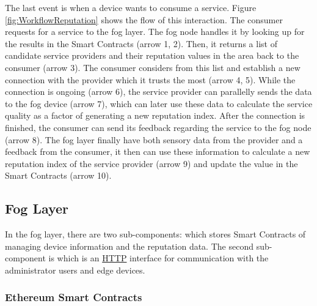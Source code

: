 \npara The last event is when a device wants to consume a service.
Figure \ref{fig:WorkflowReputation} shows the flow of this interaction.
The consumer requests for a service to the fog layer.
The fog node handles it by looking up for the results in the Smart Contracts (arrow 1, 2).
Then, it returns a list of candidate service providers and their reputation values in the area back to the consumer (arrow 3).
The consumer considers from this list and establish a new connection with the provider which it trusts the most (arrow 4, 5).
While the connection is ongoing (arrow 6), the service provider can parallelly sends the data to the fog device (arrow 7), which can later use these data to calculate the service quality as a factor of generating a new reputation index.
After the connection is finished, the consumer can send its feedback regarding the service to the fog node (arrow 8).
The fog layer finally have both sensory data from the provider and a feedback from the consumer, it then can use these information to calculate a new reputation index of the service provider (arrow 9) and update the value in the Smart Contracts (arrow 10).

\subsection{Fog Layer} \label{Methodology-Architecture-RMS-Fog}

\npara In the fog layer, there are two sub-components:  which stores Smart Contracts of managing device information and the reputation data.
The second sub-component is  which is an \hyperref[Acronym-HTTP]{HTTP} interface for communication with the administrator users and edge devices.

\subsubsection{Ethereum Smart Contracts}

